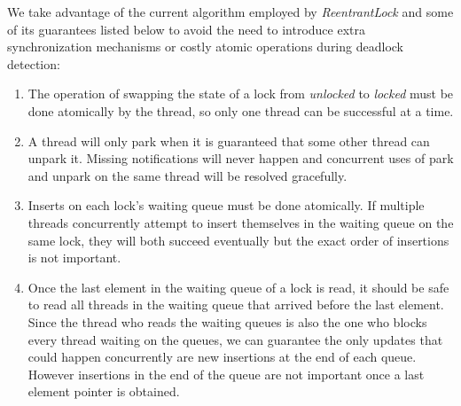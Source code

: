 We take advantage of the current algorithm employed by \emph{ReentrantLock} and some of its guarantees listed below to avoid the need to introduce extra synchronization mechanisms or costly atomic operations during deadlock detection:
\begin{enumerate}
\item The operation of swapping the state of a lock from \emph{unlocked} to \emph{locked} must be done atomically by the thread, so only one thread can be successful at a time.
\item A thread will only park when it is guaranteed that some other thread can unpark it. Missing notifications will never happen and concurrent uses of park and unpark on the same thread will be resolved gracefully.
\item Inserts on each lock's waiting queue must be done atomically. If multiple threads concurrently attempt to insert themselves in the waiting queue on the same lock, they will both succeed eventually but the exact order of insertions is not important.
\item Once the last element in the waiting queue of a lock is read, it should be safe to read all threads in the waiting queue that arrived before the last element. Since the thread who reads the waiting queues is also the one who blocks every thread waiting on the queues, we can guarantee the only updates that could happen concurrently are new insertions at the end of each queue. However insertions in the end of the queue are not important once a last element pointer is obtained.
\end{enumerate}



